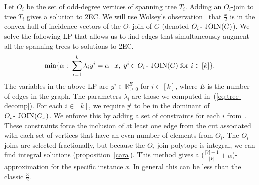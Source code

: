 Let $O_i$ be the set of odd-degree vertices of spanning tree $T_i$.
Adding an $O_i$-join to tree $T_i$ gives a solution to 2EC.
We will use Wolsey's observation~\cite{wolsey} that $\frac{x}{2}$ is in the convex hull of incidence vectors of the $O_i$-join of $G$ (denoted $O_i\operatorname{-\;JOIN}(G)$).
We solve the following LP that allows us to find edges that simultaneously augment all the spanning trees to solutions to 2EC.
\begin{equation}\label{ojoinaverage}
\min \{ \alpha:\;\sum_{i=1}^{k} \lambda_i y^i = \alpha \cdot x,\;  y^i \in O_i\operatorname{-\;JOIN}(G) \; \mbox{for $i\in [k]$}\}.
\end{equation}
The variables in the above LP are $y^i\in \mathbb{R}^{E}_{\geq 0}$ for $i\in [k]$, where $E$ is the number of edges in the graph.  The parameters $\lambda_i$ are those we computed in~(\ref{eq:tree-decomp}). For each $i\in [k]$, we require $y^i$ to be in the dominant of $O_i\operatorname{-\;JOIN}(G_x)$.  We enforce this by adding a set of constraints for each $i$ from~\cite[p. 490]{schrijverbook}. These constraints force the inclusion of at least one edge from the cut associated with each set of vertices that have an even number of elements from $O_i$. The $O_i$ joins are selected fractionally, but because the $O_i$-join polytope is integral, we can find integral solutions (proposition~\ref{cara}).  This method gives a ($\frac{|V|-1}{|V|}+\alpha$)-approximation for the specific instance $x$. In general this can be less than the classic $\frac{3}{2}$.
